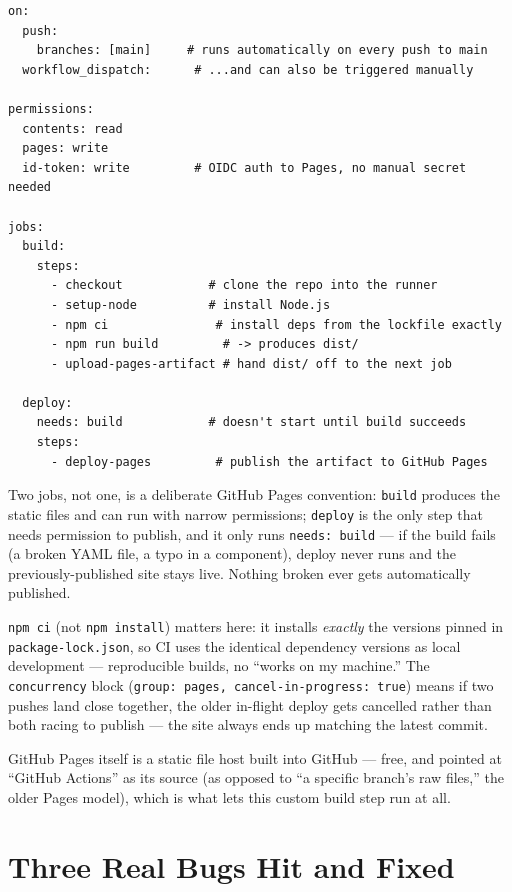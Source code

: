 \documentclass[11pt]{article}
\begin{document}
\begin{lstlisting}
on:
  push:
    branches: [main]     # runs automatically on every push to main
  workflow_dispatch:      # ...and can also be triggered manually

permissions:
  contents: read
  pages: write
  id-token: write         # OIDC auth to Pages, no manual secret needed

jobs:
  build:
    steps:
      - checkout            # clone the repo into the runner
      - setup-node          # install Node.js
      - npm ci               # install deps from the lockfile exactly
      - npm run build         # -> produces dist/
      - upload-pages-artifact # hand dist/ off to the next job

  deploy:
    needs: build            # doesn't start until build succeeds
    steps:
      - deploy-pages         # publish the artifact to GitHub Pages
\end{lstlisting}

Two jobs, not one, is a deliberate GitHub Pages convention:
\texttt{build} produces the static files and can run with narrow
permissions; \texttt{deploy} is the only step that needs permission to
publish, and it only runs \texttt{needs: build} --- if the build fails
(a broken YAML file, a typo in a component), deploy never runs and the
previously-published site stays live. Nothing broken ever gets
automatically published.

\begin{whybox}
\texttt{npm ci} (not \texttt{npm install}) matters here: it installs
\emph{exactly} the versions pinned in \texttt{package-lock.json}, so CI
uses the identical dependency versions as local development ---
reproducible builds, no ``works on my machine.'' The
\texttt{concurrency} block (\texttt{group: pages,
cancel-in-progress: true}) means if two pushes land close together, the
older in-flight deploy gets cancelled rather than both racing to
publish --- the site always ends up matching the latest commit.
\end{whybox}

GitHub Pages itself is a static file host built into GitHub --- free,
and pointed at ``GitHub Actions'' as its source (as opposed to ``a
specific branch's raw files,'' the older Pages model), which is what
lets this custom build step run at all.

\section{Three Real Bugs Hit and Fixed}
\label{sec:bugs}
\end{document}
